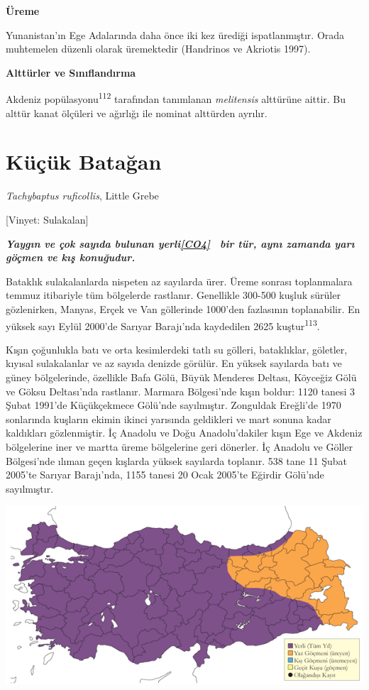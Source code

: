 \documentclass[
  letterpaper,
  DIV=11,
  numbers=noendperiod]{scrreprt}
\begin{document}
\textbf{Üreme}

Yunanistan'ın Ege Adalarında daha önce iki kez ürediği ispatlanmıştır.
Orada muhtemelen düzenli olarak üremektedir (Handrinos ve Akriotis
1997).

\textbf{Alttürler ve Sınıflandırma}

Akdeniz popülasyonu\textsuperscript{112} tarafından tanımlanan
\emph{melitensis} alttürüne aittir. Bu alttür kanat ölçüleri ve ağırlığı
ile nominat alttürden ayrılır.

\section{Küçük Batağan}\label{kuxfcuxe7uxfck-bataux11fan}

\emph{Tachybaptus ruficollis}, Little Grebe

{[}Vinyet: Sulakalan{]}

\textbf{\emph{Yaygın ve çok sayıda bulunan
yerli\hyperref[_msocom_4]{{[}CO4{]}}~ bir tür, aynı zamanda yarı göçmen
ve kış konuğudur.}}

Bataklık sulakalanlarda nispeten az sayılarda ürer. Üreme sonrası
toplanmalara temmuz itibariyle tüm bölgelerde rastlanır. Genellikle
300-500 kuşluk sürüler gözlenirken, Manyas, Erçek ve Van göllerinde
1000'den fazlasının toplanabilir. En yüksek sayı Eylül 2000'de Sarıyar
Barajı'nda kaydedilen 2625 kuştur\textsuperscript{113}.

Kışın çoğunlukla batı ve orta kesimlerdeki tatlı su gölleri,
bataklıklar, göletler, kıyısal sulakalanlar ve az sayıda denizde
görülür. En yüksek sayılarda batı ve güney bölgelerinde, özellikle Bafa
Gölü, Büyük Menderes Deltası, Köyceğiz Gölü ve Göksu Deltası'nda
rastlanır. Marmara Bölgesi'nde kışın boldur: 1120 tanesi 3 Şubat 1991'de
Küçükçekmece Gölü'nde sayılmıştır. Zonguldak Ereğli'de 1970 sonlarında
kuşların ekimin ikinci yarısında geldikleri ve mart sonuna kadar
kaldıkları gözlenmiştir. İç Anadolu ve Doğu Anadolu'dakiler kışın Ege ve
Akdeniz bölgelerine iner ve martta üreme bölgelerine geri dönerler. İç
Anadolu ve Göller Bölgesi'nde ılıman geçen kışlarda yüksek sayılarda
toplanır. 538 tane 11 Şubat 2005'te Sarıyar Barajı'nda, 1155 tanesi 20
Ocak 2005'te Eğirdir Gölü'nde sayılmıştır.

\includegraphics{images/harita_Page_051.png}
\end{document}

